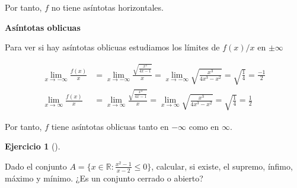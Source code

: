 \documentclass[
  a4paper,
]{scrreport}
\theoremstyle{definition}
\newtheorem{exercise}{Ejercicio}[chapter]
\theoremstyle{remark}
\begin{document}
\begin{tcolorbox}
Por tanto, \(f\) no tiene asíntotas horizontales.

\textbf{Asíntotas oblicuas}

Para ver si hay asíntotas oblicuas estudiamos los límites de \(f(x)/x\)
en \(\pm\infty\)

\begin{align*}
\lim_{x\to-\infty}\frac{f(x)}{x} &=  \lim_{x\to-\infty} \frac{\sqrt{\frac{x^3}{4x-1}}}{x} = \lim_{x\to-\infty} \sqrt{\frac{x^3}{4x^3-x^2}} = \sqrt{\frac{1}{4}} = \frac{-1}{2}\\
\lim_{x\to\infty}\frac{f(x)}{x} &=  \lim_{x\to\infty} \frac{\sqrt{\frac{x^3}{4x-1}}}{x} = \lim_{x\to\infty} \sqrt{\frac{x^3}{4x^3-x^2}} = \sqrt{\frac{1}{4}} = \frac{1}{2}
\end{align*}

Por tanto, \(f\) tiene asíntotas oblicuas tanto en \(-\infty\) como en
\(\infty\).

\end{tcolorbox}

\begin{exercise}[]\protect\hypertarget{exr-5}{}\label{exr-5}

Dado el conjunto \(A=\{x\in\mathbb{R} : \frac{x^2-1}{x-2}\leq 0\}\),
calcular, si existe, el supremo, ínfimo, máximo y mínimo. ¿Es un
conjunto cerrado o abierto?

\end{exercise}
\end{document}
